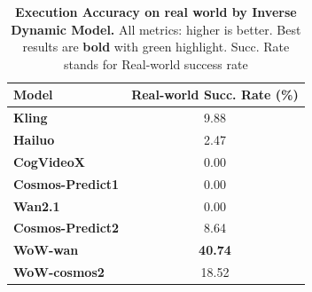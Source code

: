 
\begin{table}[!h]
\centering
\caption{\textbf{Execution Accuracy on real world by Inverse Dynamic Model.}
All metrics: higher is better. Best results are \textbf{bold} with green highlight. Succ. Rate stands for Real-world success rate}
\label{tab:execution}
\setlength{\tabcolsep}{3pt} %
\begin{tabular}{lc}
\toprule
\textbf{Model} & \textbf{Real-world Succ. Rate (\%)} \\
\midrule
\textbf{Kling} & 9.88   \\
\textbf{Hailuo} & 2.47   \\
\midrule
\textbf{CogVideoX} & 0.00   \\
\textbf{Cosmos-Predict1} & 0.00 \\
\textbf{Wan2.1} & 0.00  \\
\textbf{Cosmos-Predict2} & 8.64   \\
\textbf{WoW-wan} & \cellcolor{mylightgreen}\textbf{40.74}   \\
\textbf{WoW-cosmos2} & 18.52  \\
\bottomrule
\end{tabular}
\end{table}
